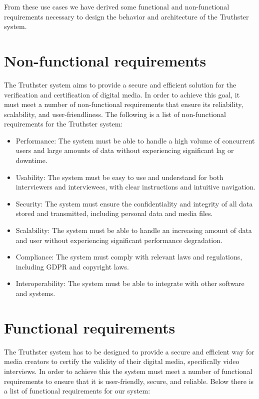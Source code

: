 \documentclass[target=mst,aauheader=]{thud}
\begin{document}
From these use cases we have derived some functional and non-functional requirements necessary to design the behavior and architecture of the Truthster system.\\

\section{Non-functional requirements}

The Truthster system aims to provide a secure and efficient solution for the verification and certification of digital media. In order to achieve this goal, it must meet a number of non-functional requirements that ensure its reliability, scalability, and user-friendliness. The following is a list of non-functional requirements for the Truthster system:\\

\begin{itemize}

    \item Performance: The system must be able to handle a high volume of concurrent users and large amounts of data without experiencing significant lag or downtime.
    \item Usability: The system must be easy to use and understand for both interviewers and interviewees, with clear instructions and intuitive navigation.
    \item Security: The system must ensure the confidentiality and integrity of all data stored and transmitted, including personal data and media files.
    \item Scalability: The system must be able to handle an increasing amount of data and user without experiencing significant performance degradation.
    \item Compliance: The system must comply with relevant laws and regulations, including GDPR and copyright laws.
    \item Interoperability: The system must be able to integrate with other software and systems.

\end{itemize}

\section{Functional requirements}

The Truthster system has to be designed to provide a secure and efficient way for media creators to certify the validity of their digital media, specifically video interviews. In order to achieve this the system must meet a number of functional requirements to ensure that it is user-friendly, secure, and reliable. 
Below there is a list of functional requirements for our system:
\end{document}
